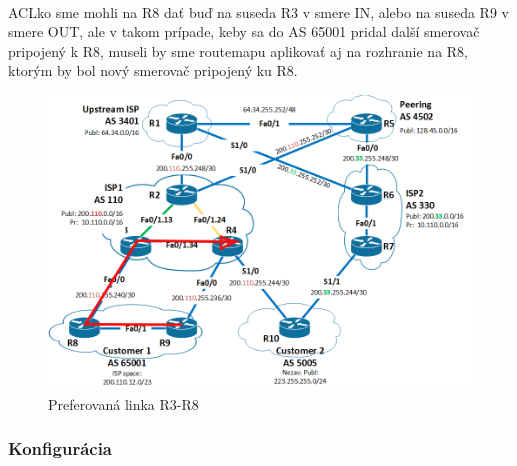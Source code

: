 \documentclass[12pt,twoside,a4paper]{report}
\begin{document}
\paragraph{}
ACLko  sme mohli na R8 dať buď na suseda R3 v smere IN, alebo na suseda R9 v smere OUT, ale v takom prípade, keby sa do AS 65001 pridal další smerovač pripojený k R8, museli by sme routemapu aplikovať aj na rozhranie na R8, ktorým by bol nový smerovač pripojený ku R8.

\begin{figure}[!htbp]
\centering
\includegraphics[width=14cm,keepaspectratio]{bgp_isis_r3_r8_primary}
\caption{Preferovaná linka R3-R8}
\label{fig:bgp_isis_topo_r3_r8}
\end{figure}

\newpage

\subsubsection{Konfigurácia}
\paragraph{}
\end{document}
